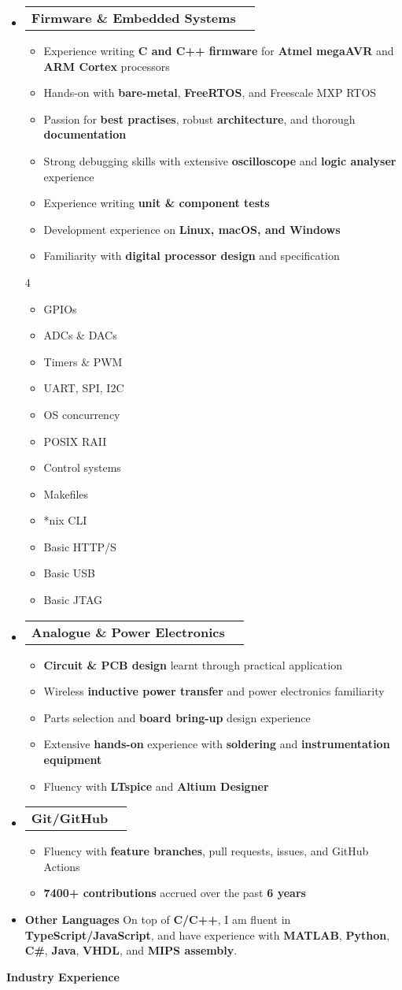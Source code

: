 \documentclass[11pt,a4paper]{article}[leftmargin=*]
\makeatletter
\def \entryspacing {-0pt}
\def \bulletstylei {\faAngleRight\hspace{-4.5pt}}
\renewcommand{\section}[2]{\vspace{5pt}
  \colorbox{secondary}{\color{white}\raggedbottom\normalsize\textbf{{#1}{\hspace{2pt}#2\hspace{4pt}}}}
}
\newcommand{\resumeEntryStart}{\begin{itemize}[leftmargin=2.5mm]}
\newcommand{\resumeEntryEnd}{\end{itemize}\vspace{\entryspacing}}
\newcommand{\resumeItemListStart}{\begin{itemize}[leftmargin=4.5mm]}
\newcommand{\resumeItemListEnd}{\end{itemize}}
\newcommand{\resumeItemListStartColumns}[2][-0.5]{\vspace*{#1\multicolsep}
\begin{multicols}{#2}\begin{itemize}[leftmargin=4.5mm]}
\newcommand{\resumeItemListEndColumns}[1][-1]{\end{itemize}\end{multicols}\vspace*{#1\multicolsep}}
\newcommand{\resumeItem}[2][\bulletstylei]{
  \item[\small#1]\small{
    {#2 \vspace{-2pt}}
  }
}
\newcommand{\resumeEntryTD}[2]{
  \vspace{-1pt}\item[]
    \begin{tabularx}{0.97\textwidth}{X@{\hspace{60pt}}r}
      \textbf{\color{primary}#1} & {\firabook\color{accent}\small#2} \\
    \end{tabularx}\vspace{-6pt}
}
\newcommand{\resumeEntryS}[2]{
  \item[]\small{
    \textbf{\color{primary}#1 }{ #2 \vspace{-4pt}}
  }
}
\newcommand{\resumeBf}[1]{\small\textbf{\color{halfbold}#1}}
\makeatother
\begin{document}
\resumeEntryStart
\resumeEntryTD
{Firmware \& Embedded Systems}{}
\resumeItemListStart
\resumeItem {Experience writing \resumeBf{C and C++ firmware} for \resumeBf{Atmel megaAVR} and \resumeBf{ARM Cortex} processors}
\resumeItem {Hands-on with \resumeBf{bare-metal}, \resumeBf{FreeRTOS}, and Freescale MXP RTOS}
\resumeItem {Passion for \resumeBf{best practises}, robust \resumeBf{architecture}, and thorough \resumeBf{documentation}}
\resumeItem {Strong debugging skills with extensive \resumeBf{oscilloscope} and \resumeBf{logic analyser} experience}
\resumeItem {Experience writing \resumeBf{unit \& component tests}}
\resumeItem {Development experience on \resumeBf{Linux, macOS, and Windows}}
\resumeItem {Familiarity with \resumeBf{digital processor design} and specification}
\resumeItemListEnd
\resumeItemListStartColumns[-0.5]{4}
\resumeItem {GPIOs}
\resumeItem {ADCs \& DACs}
\resumeItem {Timers \& PWM}
\resumeItem {UART, SPI, I2C}
\resumeItem {OS concurrency}
\resumeItem {POSIX RAII}
\resumeItem {Control systems}
\resumeItem {Makefiles}
\resumeItem {*nix CLI}
\resumeItem {Basic HTTP/S}
\resumeItem {Basic USB}
\resumeItem {Basic JTAG}
\resumeItemListEndColumns
\resumeEntryEnd

\resumeEntryStart
\resumeEntryTD
{Analogue \& Power Electronics}{}
\resumeItemListStart
\resumeItem {\resumeBf{Circuit \& PCB design} learnt through practical application}
\resumeItem {Wireless \resumeBf{inductive power transfer} and power electronics familiarity}
\resumeItem {Parts selection and \resumeBf{board bring-up} design experience}
\resumeItem {Extensive \resumeBf{hands-on} experience with \resumeBf{soldering} and \resumeBf{instrumentation equipment}}
\resumeItem {Fluency with \resumeBf{LTspice} and \resumeBf{Altium Designer}}
\resumeItemListEnd
\resumeEntryEnd

\resumeEntryStart
\resumeEntryTD
{Git/GitHub}{}
\resumeItemListStart
\resumeItem {Fluency with \resumeBf{feature branches}, pull requests, issues, and GitHub Actions}
\resumeItem {\resumeBf{7400+ contributions} accrued over the past \resumeBf{6 years}}
\resumeItemListEnd
\resumeEntryEnd

\resumeEntryStart
\resumeEntryS
{Other Languages}{On top of \resumeBf{C/C++}, I am fluent in \resumeBf{TypeScript/JavaScript}, and have experience with \resumeBf{MATLAB}, \resumeBf{Python}, \resumeBf{C\#}, \resumeBf{Java}, \resumeBf{VHDL}, and \resumeBf{MIPS assembly}.}
\resumeEntryEnd


\section{\faBriefcase}{Industry Experience}
\end{document}
